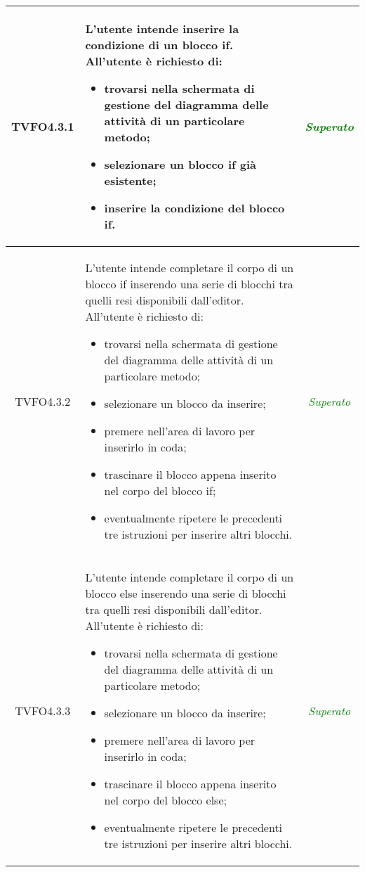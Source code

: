 \begin{longtable}{|c|>{}m{8cm}|c|}
\hypertarget{TVFO4.3.1}{TVFO4.3.1} & L'utente intende inserire la condizione di un blocco if.
All'utente è richiesto di:
\begin{itemize}
	\item trovarsi nella schermata di gestione del diagramma delle attività di un particolare metodo;
	\item selezionare un blocco if già esistente;
	\item inserire la condizione del blocco if.
\end{itemize} & \textcolor{Green}{\textit{Superato}}\\ \hline

\hypertarget{TVFO4.3.2}{TVFO4.3.2} & L'utente intende completare il corpo di un blocco if inserendo una serie di blocchi tra quelli resi disponibili dall'editor.
All'utente è richiesto di:
\begin{itemize}
	\item trovarsi nella schermata di gestione del diagramma delle attività di un particolare metodo;
	\item selezionare un blocco da inserire;
	\item premere nell'area di lavoro per inserirlo in coda;
	\item trascinare il blocco appena inserito nel corpo del blocco if;
	\item eventualmente ripetere le precedenti tre istruzioni per inserire altri blocchi.
\end{itemize} & \textcolor{Green}{\textit{Superato}}\\ \hline

\hypertarget{TVFO4.3.3}{TVFO4.3.3} & L'utente intende completare il corpo di un blocco else inserendo una serie di blocchi tra quelli resi disponibili dall'editor.
All'utente è richiesto di:
\begin{itemize}
	\item trovarsi nella schermata di gestione del diagramma delle attività di un particolare metodo;
	\item selezionare un blocco da inserire;
	\item premere nell'area di lavoro per inserirlo in coda;
	\item trascinare il blocco appena inserito nel corpo del blocco else;
	\item eventualmente ripetere le precedenti tre istruzioni per inserire altri blocchi.
\end{itemize} & \textcolor{Green}{\textit{Superato}}\\ \hline


\end{longtable}
